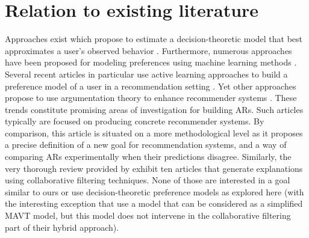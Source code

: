 \documentclass[version=3.21, pagesize, twoside=off, bibliography=totoc, DIV=calc, fontsize=12pt, a4paper, french, english]{scrartcl}
\begin{document}
\section{Relation to existing literature}
\label{sec:litt}
Approaches exist which propose to estimate a decision-theoretic model that best approximates a user’s observed behavior \citep{greco_trends_2010, sobrie_learning_2018}. 
Furthermore, numerous approaches have been proposed for modeling preferences using machine learning methods \citep{furnkranz_preference_2010}. 
Several recent articles in particular use active learning approaches to build a preference model of a user in a recommendation setting \citep{teso_constructive_2016, teso_coactive_2017, dragone_constructive_2018, erculiani_automating_2018, dragone_no_2018}.
Yet other approaches propose to use argumentation theory \citep{besnard_elements_2008} to enhance recommender systems \citep{chesnevar_empowering_2009, rago_argumentation-based_2018}. These trends constitute promising areas of investigation for building \acp{AR}. Such articles typically are focused on producing concrete recommender systems. By comparison, this article is situated on a more methodological level as it proposes a precise definition of a new goal for recommendation systems, and a way of comparing \acp{AR} experimentally when their predictions disagree. Similarly, the very thorough review provided by \citet{nunes_systematic_2017} exhibit ten articles that generate explanations using collaborative filtering techniques. None of those are interested in a goal similar to ours or use decision-theoretic preference models as explored here (with the interesting exception that \citet{marx_increasing_2010} use a model that can be considered as a simplified MAVT model, but this model does not intervene in the collaborative filtering part of their hybrid approach).
\end{document}
